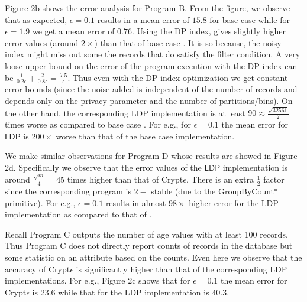 Figure 2b shows the error analysis for Program B. From the figure, we observe that as expected, $\epsilon=0.1$ results in a mean error of $15.8$ for base case \system while for $\epsilon=1.9$ we get a mean error of $0.76$. Using the DP index, gives slightly higher error values (around $2\times$) than that of base case \system. It is so because, the noisy index might miss out some the records that do satisfy the filter condition. A very loose upper bound on the error of the program execution with the DP index can be $\frac{1}{0.2\epsilon}+\frac{2}{0.8\epsilon}=\frac{7.5}{\epsilon}$. Thus even with the DP index optimization we get constant error bounds (since the noise added is independent of the number of records and depends only on the privacy parameter and the number of partitions/bins). On the other hand, the corresponding \textsf{LDP} implementation is  at least $90 \approx \frac{\sqrt{32561}}{2}$ times worse as compared to base case \system. For e.g., for $\epsilon=0.1$ the mean error for $\textsf{LDP}$ is $200\times $ worse than that of the base case \system implementation.

We make similar observations for Program D whose results are showed in Figure 2d. Specifically we observe that the error values of the $\textsf{LDP}$ implementation is around $\frac{\sqrt{m}}{4}=45 $ times higher than that of Crypt$\epsilon$. There is an extra $\frac{1}{2}$ factor since  the corresponding \system program is $2-$ stable (due to the \textsf{GroupByCount*} primitive). For e.g., $\epsilon=0.1$ results in almost $98 \times$ higher error for the \textsf{LDP} implementation as compared to that of \system. 

Recall Program C outputs the number of age values with at least 100 records. Thus Program C does not directly report counts of records in the database but some statistic on an attribute based on the counts. Even here we observe that the accuracy of Crypt$\epsilon$ is significantly higher than that of the corresponding \textsf{LDP} implementations. For e.g., Figure 2c shows that for $\epsilon=0.1$ the mean error for Crypt$\epsilon$ is $23.6$ while that for the \textsf{LDP} implementation is $40.3$. 

